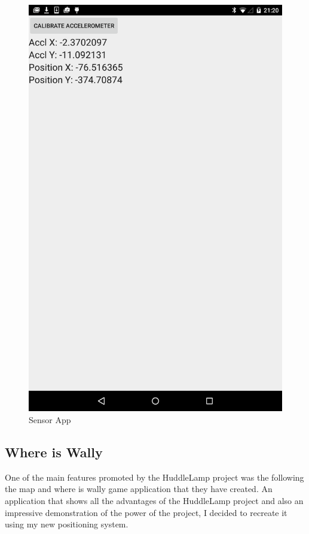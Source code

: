 \begin{figure}[h]
    \includegraphics[scale=0.2]{images/sensor}
    \protect\caption{Sensor App} 
    \label{sensor_app_image}
\end{figure}


\subsection{Where is Wally}
One of the main features promoted by the HuddleLamp project was the following the map and where is wally game application that they have created. An application that shows all the advantages of the HuddleLamp project and also an impressive demonstration of the power of the project, I decided to recreate it using my new positioning system. 

